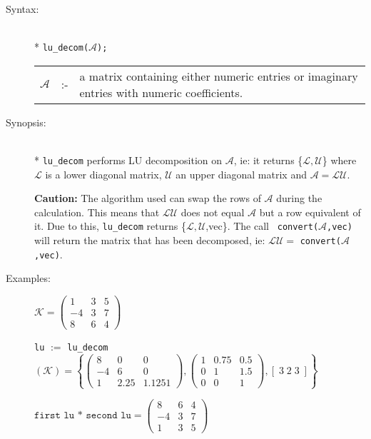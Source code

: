 \begin{description}
\item[Syntax:]\mbox{}\\*
\texttt{lu\_decom($\mathcal{A}$);}\\[2mm]
\begin{tabular}{l l l}
$\mathcal{A}$ &:-& \parbox[t]{.848\linewidth}{a matrix containing either
numeric entries or imaginary entries with numeric coefficients.}
\end{tabular}

\item[Synopsis:]\mbox{}\\*
  \texttt{lu\_decom} performs LU decomposition on $\mathcal{A}$, ie: it returns
  \{$\mathcal{L,U}$\} where $\mathcal{L}$ is a lower diagonal matrix, $\mathcal{U}$ an
  upper diagonal matrix and $\mathcal{A} = \mathcal{LU}$.

\textbf{Caution:}
  The algorithm used can swap the rows of $\mathcal{A}$ during the calculation. This
  means that $\mathcal{LU}$ does not equal $\mathcal{A}$ but a row equivalent of it. Due
  to this, \texttt{lu\_decom} returns \{$\mathcal{L,U}$,vec\}. The call {\tt
  convert($\mathcal{A}$,vec)} will return the matrix that has been decomposed, ie:
  $\mathcal{LU} = $ \texttt{convert($\mathcal{A}$,vec)}.

\item[Examples:]
\(
\mathcal{K} = \begin{pmatrix} 1 & 3 & 5 \\ -4 & 3 & 7 \\ 8 & 6 & 4 \end{pmatrix}
\)

\texttt{lu} $:=$ \texttt{lu\_decom}\((\mathcal{K}) =
\left\{
        \begin{pmatrix} 8 & 0 & 0 \\ -4 & 6 & 0 \\ 1 & 2.25 & 1.125 1 \end{pmatrix},
        \begin{pmatrix} 1 & 0.75 & 0.5 \\ 0 & 1 & 1.5 \\ 0 & 0 & 1 \end{pmatrix},
	[\; 3 \; 2 \; 3 \; ]
\right\}\)

\(\texttt{first lu * second lu} =
        \begin{pmatrix} 8 & 6 & 4 \\ -4 & 3 & 7 \\ 1 & 3 & 5 \end{pmatrix}\)


\end{description}
